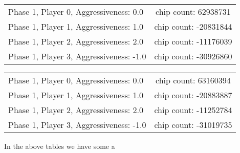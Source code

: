 \documentclass[titlepage, a4paper]{article}
\begin{document}
\begin{tabular}{| l | c |}
	\hline
	Phase 1, Player 0, Aggressiveness: 0.0 & chip count: 62938731\\
	Phase 1, Player 1, Aggressiveness: 1.0 & chip count: -20831844\\
	Phase 1, Player 2, Aggressiveness: 2.0 & chip count: -11176039\\
	Phase 1, Player 3, Aggressiveness: -1.0 & chip count: -30926860\\
	\hline
\end{tabular}

\begin{tabular}{| l | c |}
	\hline
	Phase 1, Player 0, Aggressiveness: 0.0 & chip count: 63160394\\
	Phase 1, Player 1, Aggressiveness: 1.0 & chip count: -20883887\\
	Phase 1, Player 2, Aggressiveness: 2.0 & chip count: -11252784\\
	Phase 1, Player 3, Aggressiveness: -1.0 & chip count: -31019735\\
	\hline
\end{tabular}

In the above tables we have some a
\end{document}

